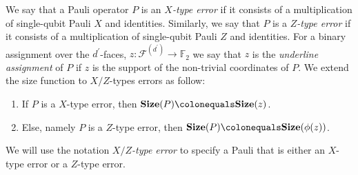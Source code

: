 \begin{definition}
  We say that a Pauli operator $P$ is an \textit{$X$-type error} if it consists of a multiplication of single-qubit Pauli $X$ and identities. Similarly, we say that $P$ is a \textit{$Z$-type error} if it consists of a multiplication of single-qubit Pauli $Z$ and identities. For a binary assignment over the $d^{\prime}$-faces, $z : \mathcal{F}^{(d^{\prime})} \rightarrow \mathbb{F}_{2}$ we say that $z$ is the \textit{underline assignment} of $P$ if $z$ is the support of the non-trivial coordinates of $P$. We extend the size function to $X/Z$-types errors as follow: 
  \begin{enumerate}
    \item If $P$ is a $X$-type error, then $\Size{P} \colonequals \Size{z}$. 
    \item Else, namely $P$ is a $Z$-type error, then $\Size{P} \colonequals \Size{\phi(z)}$. 
  \end{enumerate}
We will use the notation \textit{$X/Z$-type error} to specify a Pauli that is either an $X$-type error or a $Z$-type error.
\end{definition}


